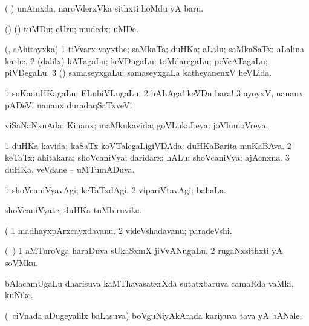 \noindent
\gl{\pagu}
\expl{}
\bmng
{} ( \ashi) unAmxda, naroVderxVka sithxti hoMdu yA baru. 
\emng
\eentry

\bentry
{} 
\gl{\nA}
\expl{}
\bmng
(\birx) (\AmA) tuMDu; cUru; mudedx; uMDe. 
\emng
\eentry

\bentry
{} 
\gl{\nA}
\expl{}
\bmng
(\pArxparx, sAhitayxka) 
\bnum
\num{1} tiVvarx vayxthe; saMkaTa; duHKa; aLalu; saMkaSaTx:  aLalina kathe. 
\num{2} (\bava dalilx) kATagaLu; keVDugaLu; toMdaregaLu; peVcATagaLu; piVDegaLu. 
\num{3} (\hA) samaseyxgaLu:  samaseyxgaLa katheyanenxV heVLida. 
\enum
\emng

\noindent
\gl{\pagu}
\expl{}
\bmng
\bnum
\num{1}  suKaduHKagaLu; ELubiVLugaLu. 
\num{2}  hALAga! keVDu bara! 
\num{3}  ayoyxV, nananx pADeV! nananx duradaqSaTxveV! 
\enum
\emng
\eentry

\bentry
{} 
\gl{\gu}
\expl{}
\bmng
viSaNaNxnAda; Kinanx; maMkukavida; goVLukaLeya; joVlumoVreya. 
\emng
\eentry

\bentry
{} 
\gl{\gu}
\expl{}
\bmng
\bnum
\num{1} duHKa kavida; kaSaTx koVTalegaLigiVDAda:  duHKaBarita muKaBAva. 
\num{2} keTaTx; ahitakara; shoVcaniVya; daridarx; hALu:  shoVcaniVya; ajAcnxna. 
\num{3} duHKa, veVdane -- uMTumADuva. 
\enum
\emng
\eentry

\bentry
{} 
\gl{\kirxvi}
\expl{}
\bmng
\bnum
\num{1} shoVcaniVyavAgi; keTaTxdAgi. 
\num{2} vipariVtavAgi; bahaLa. 
\enum
\emng
\eentry

\bentry
{} 
\gl{\nA}
\expl{}
\bmng
shoVcaniVyate; duHKa tuMbiruvike. 
\emng
\eentry

\bentry
{} 
\gl{\nA}
\expl{}
\gl{\ashi}
\bmng
( 
\bnum
\num{1} madhayxpArxcayxdavanu. 
\num{2} videVshadavanu; paradeVshi. 
\enum
\emng
\eentry

\bentry
{} 
\gl{\nA}
\expl{}
\bmng
(\AseTxrXV\ \ashi) 
\bnum
\num{1} aMTuroVga haraDuva sUkaSxmX jiVvANugaLu. 
\num{2} rugaNxsithxti yA soVMku. 
\enum
\emng
\eentry

\bentry
{} 
\gl{\nA}
\expl{}
\bmng
bAlacamUgaLu dharisuva kaMThavasatxrXda sutatxbaruva camaRda vaMki, kuNike. 
\emng
\eentry

\bentry
{} 
\gl{\nA}
\expl{}
\bmng
(\kanmu\ ciVnada aDugeyalilx baLasuva) boVguNiyAkArada kariyuva tava yA bANale. 
\emng
\eentry

